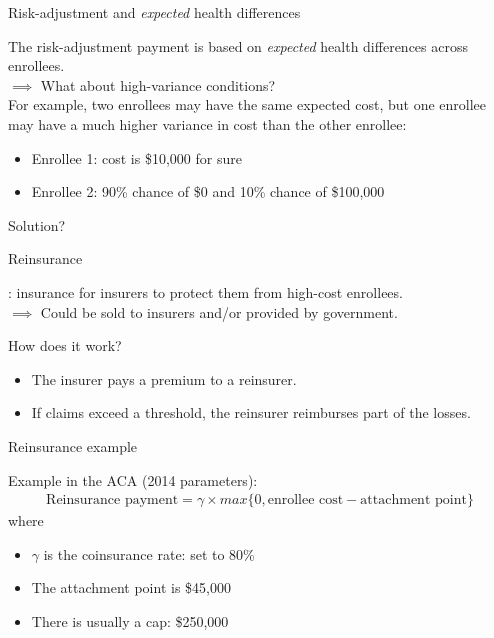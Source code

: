 \begin{frame}{Risk-adjustment and \textit{expected} health differences}

    The risk-adjustment payment is based on \textit{expected} health differences across enrollees.\\
    $\implies$ What about high-variance conditions?\\
    \pause
    For example, two enrollees may have the same expected cost, but one enrollee may have a much higher variance in cost than the other enrollee:
    \begin{itemize}
        \item Enrollee 1: cost is \$10,000 for sure
        \item Enrollee 2: 90\% chance of \$0 and 10\% chance of \$100,000
    \end{itemize}
    \vspace{3mm}

    Solution? 
    \pause {}


\end{frame}
\begin{frame}{Reinsurance}

    : insurance for insurers to protect them from high-cost enrollees.\\
    $\implies$ Could be sold to insurers and/or provided by government.\\
    \vspace{3mm}

    How does it work?\\
    \begin{itemize}
    \item The insurer pays a premium to a reinsurer.
    \item If claims exceed a threshold, the reinsurer reimburses part of the losses.
    \end{itemize}

\end{frame}
\begin{frame}{Reinsurance example}

    Example in the ACA (2014 parameters):
    \begin{align*}
        \text{Reinsurance payment} = \gamma \times max\{0, \text{enrollee cost} - \text{attachment point}\}
    \end{align*}
    where
    \begin{itemize}
        \item $\gamma$ is the coinsurance rate: set to 80\%
        \item The attachment point is \$45,000
        \item There is usually a cap: \$250,000
    \end{itemize}

\end{frame}

